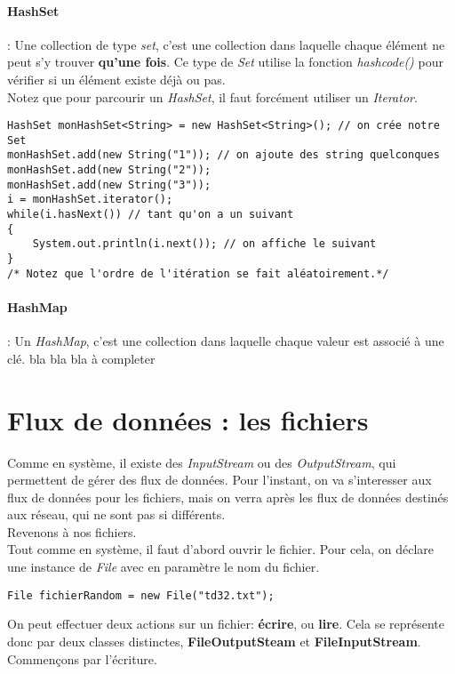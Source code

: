 \documentclass{article}
\begin{document}
\paragraph{HashSet} : Une collection de type \emph{set}, c'est une collection dans laquelle chaque élément ne peut s'y trouver \textbf{qu'une fois}. Ce type de \emph{Set} utilise la fonction \emph{hashcode()} pour vérifier si un élément existe déjà ou pas.\\
Notez que pour parcourir un \emph{HashSet}, il faut forcément utiliser un \emph{Iterator}.
\begin{lstlisting}
HashSet monHashSet<String> = new HashSet<String>(); // on crée notre Set
monHashSet.add(new String("1")); // on ajoute des string quelconques
monHashSet.add(new String("2"));
monHashSet.add(new String("3"));
i = monHashSet.iterator();
while(i.hasNext()) // tant qu'on a un suivant
{
	System.out.println(i.next()); // on affiche le suivant
}
/* Notez que l'ordre de l'itération se fait aléatoirement.*/	
\end{lstlisting}

\paragraph{HashMap} : Un \emph{HashMap}, c'est une collection dans laquelle chaque valeur est associé à une clé.
bla bla bla à completer

\section{Flux de données : les fichiers}
Comme en système, il existe des \emph{InputStream} ou des \emph{OutputStream}, qui permettent de gérer des flux de données. Pour l'instant, on va s'interesser aux flux de données pour les fichiers, mais on verra après les flux de données destinés aux réseau, qui ne sont pas si différents.\\
Revenons à nos fichiers. \\
Tout comme en système, il faut d'abord ouvrir le fichier. Pour cela, on déclare une instance de \emph{File} avec en paramètre le nom du fichier.
\begin{lstlisting}
File fichierRandom = new File("td32.txt");
\end{lstlisting}
On peut effectuer deux actions sur un fichier: \textbf{écrire}, ou \textbf{lire}. Cela se représente donc par deux classes distinctes, \textbf{FileOutputSteam} et \textbf{FileInputStream}.\\
Commençons par l'écriture.
\end{document}
